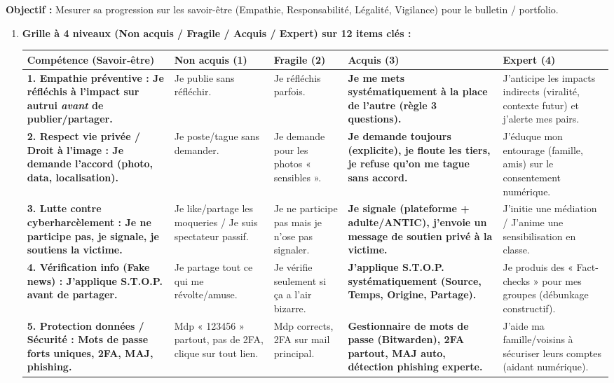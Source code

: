 \documentclass[11pt]{article}
\begin{document}
\begin{methode}
\textbf{Objectif :} Mesurer sa progression sur les savoir-être (Empathie, Responsabilité, Légalité, Vigilance) pour le bulletin / portfolio.
\begin{enumerate}
    \item \textbf{Grille à 4 niveaux (Non acquis / Fragile / Acquis / Expert) sur 12 items clés :}
    \begin{center}
    \begin{tabularx}{\linewidth}{|>{\bfseries}l|X|X|X|X|}
    \hline
    \textbf{Compétence (Savoir-être)} & \textbf{Non acquis (1)} & \textbf{Fragile (2)} & \textbf{Acquis (3)} & \textbf{Expert (4)} \\
    \hline
    1. \textbf{Empathie préventive} : Je réfléchis à l'impact sur autrui \emph{avant} de publier/partager. & Je publie sans réfléchir. & Je réfléchis parfois. & \textbf{Je me mets systématiquement à la place de l'autre (règle 3 questions).} & J'anticipe les impacts indirects (viralité, contexte futur) et j'alerte mes pairs. \\
    \hline
    2. \textbf{Respect vie privée / Droit à l'image} : Je demande l'accord (photo, data, localisation). & Je poste/tague sans demander. & Je demande pour les photos « sensibles ». & \textbf{Je demande toujours (explicite), je floute les tiers, je refuse qu'on me tague sans accord.} & J'éduque mon entourage (famille, amis) sur le consentement numérique. \\
    \hline
    3. \textbf{Lutte contre cyberharcèlement} : Je ne participe pas, je signale, je soutiens la victime. & Je like/partage les moqueries / Je suis spectateur passif. & Je ne participe pas mais je n'ose pas signaler. & \textbf{Je signale (plateforme + adulte/ANTIC), j'envoie un message de soutien privé à la victime.} & J'initie une médiation / J'anime une sensibilisation en classe. \\
    \hline
    4. \textbf{Vérification info (Fake news)} : J'applique S.T.O.P. avant de partager. & Je partage tout ce qui me révolte/amuse. & Je vérifie seulement si ça a l'air bizarre. & \textbf{J'applique S.T.O.P. systématiquement (Source, Temps, Origine, Partage).} & Je produis des « Fact-checks » pour mes groupes (débunkage constructif). \\
    \hline
    5. \textbf{Protection données / Sécurité} : Mots de passe forts uniques, 2FA, MAJ, phishing. & Mdp « 123456 » partout, pas de 2FA, clique sur tout lien. & Mdp corrects, 2FA sur mail principal. & \textbf{Gestionnaire de mots de passe (Bitwarden), 2FA partout, MAJ auto, détection phishing experte.} & J'aide ma famille/voisins à sécuriser leurs comptes (aidant numérique). \\

\end{tabularx}
\end{center}
\end{enumerate}
\end{methode}
\end{document}
